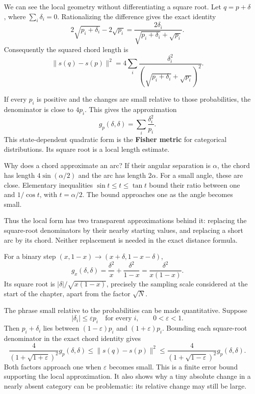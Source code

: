 \documentclass[11pt,oneside,openany]{book}
\theoremstyle{definition}
\theoremstyle{remark}
\numberwithin{equation}{chapter}
\begin{document}
We can see the local geometry without differentiating a square root. Let \(q=p+\delta\), where \(\sum_i\delta_i=0\). Rationalizing the difference gives the exact identity \[2\sqrt{p_i+\delta_i}-2\sqrt{p_i}
=\frac{2\delta_i}{\sqrt{p_i+\delta_i}+\sqrt{p_i}}.\] Consequently the squared chord length is \[\|s(q)-s(p)\|^2
=4\sum_i\frac{\delta_i^2}
{(\sqrt{p_i+\delta_i}+\sqrt{p_i})^2}.\]

If every \(p_i\) is positive and the changes are small relative to those probabilities, the denominator is close to \(4p_i\). This gives the approximation \[\boxed{g_p(\delta,\delta)=\sum_i\frac{\delta_i^2}{p_i}.}\] This state-dependent quadratic form is the \textbf{Fisher metric} for categorical distributions. Its square root is a local length estimate.

Why does a chord approximate an arc? If their angular separation is \(\alpha\), the chord has length \(4\sin(\alpha/2)\) and the arc has length \(2\alpha\). For a small angle, these are close. Elementary inequalities \(\sin t\leq t\leq\tan t\) bound their ratio between one and \(1/\cos t\), with \(t=\alpha/2\). The bound approaches one as the angle becomes small.

Thus the local form has two transparent approximations behind it: replacing the square-root denominators by their nearby starting values, and replacing a short arc by its chord. Neither replacement is needed in the exact distance formula.

For a binary step \((x,1-x)\to(x+\delta,1-x-\delta)\), \[g_x(\delta,\delta)=\frac{\delta^2}{x}+\frac{\delta^2}{1-x}
=\frac{\delta^2}{x(1-x)}.\] Its square root is \(|\delta|/\sqrt{x(1-x)}\), precisely the sampling scale considered at the start of the chapter, apart from the factor \(\sqrt N\).

The phrase small relative to the probabilities can be made quantitative. Suppose \[|\delta_i|\leq\varepsilon p_i\quad\text{for every }i,\qquad 0<\varepsilon<1.\] Then \(p_i+\delta_i\) lies between \((1-\varepsilon)p_i\) and \((1+\varepsilon)p_i\). Bounding each square-root denominator in the exact chord identity gives \[\frac{4}{(1+\sqrt{1+\varepsilon})^2}g_p(\delta,\delta)
\leq\|s(q)-s(p)\|^2
\leq\frac{4}{(1+\sqrt{1-\varepsilon})^2}g_p(\delta,\delta).\] Both factors approach one when \(\varepsilon\) becomes small. This is a finite error bound supporting the local approximation. It also shows why a tiny absolute change in a nearly absent category can be problematic: its relative change may still be large.
\end{document}

